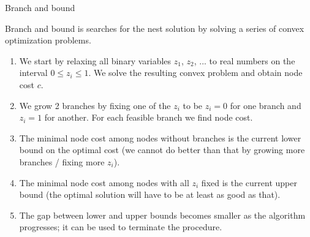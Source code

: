 \documentclass{beamer}
\begin{document}
\begin{frame}{Branch and bound}
	\begin{flushleft}
		
		Branch and bound is searches for the nest solution by solving a series of convex optimization problems.
		
		{\small
		\begin{enumerate}
			\item We start by relaxing all binary variables $z_1$, $z_2$, ... to real numbers on the interval $0 \leq z_i \leq 1$. We solve the resulting convex problem and obtain node cost $c$.
			
			\item We grow 2 branches by fixing one of the $z_i$ to be $z_i = 0$ for one branch and $z_i = 1$ for another. For each feasible branch we find node cost.
			
			\item The minimal node cost among nodes without branches is the current lower bound on the optimal cost (we cannot do better than that by growing more branches / fixing more $z_i$).
			
			\item The minimal node cost among nodes with all $z_i$ fixed is the current upper bound (the optimal solution will have to be at least as good as that).
			
			\item The gap between lower and upper bounds becomes smaller as the algorithm progresses; it can be used to terminate the procedure.
		\end{enumerate}}
		
	\end{flushleft}
\end{frame}
\end{document}
